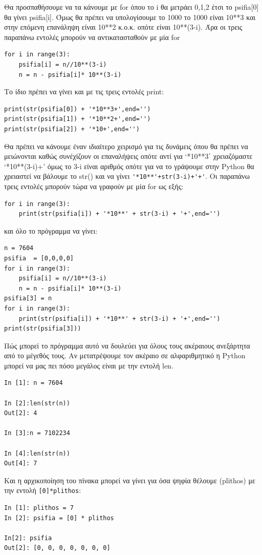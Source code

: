 Θα προσπαθήσουμε να τα κάνουμε με for όπου το i θα μετράει 0,1,2 έτσι το psifia[0] θα γίνει psifia[i]. Όμως θα πρέπει να υπολογίσουμε το 1000 το 1000 είναι 10**3 και στην επόμενη επανάληψη είναι 10**2 κ.ο.κ. οπότε είναι 10**(3-i).
Άρα οι τρεις παραπάνω εντολές μπορούν να αντικατασταθούν με μία for
\begin{lstlisting}
for i in range(3):
    psifia[i] = n//10**(3-i)
    n = n - psifia[i]* 10**(3-i)
\end{lstlisting}

Το ίδιο πρέπει να γίνει και με τις τρεις εντολές print:
\begin{lstlisting}
print(str(psifia[0]) + '*10**3+',end='')
print(str(psifia[1]) + '*10**2+',end='')
print(str(psifia[2]) + '*10+',end='')
\end{lstlisting}
Θα πρέπει να κάνουμε έναν ιδιαίτερο χειρισμό για τις δυνάμεις όπου θα πρέπει να μειώνονται καθώς συνέχίζουν οι επαναλήψεις οπότε αντί για `*10**3΄ χρειαζόμαστε `*10**(3-i)+' όμως το 3-i είναι αριθμός οπότε για να το γράψουμε στην Python θα χρειαστεί να βάλουμε το str() και να γίνει \lstinline{'*10**'+str(3-i)+'+'}. Οι παραπάνω τρεις εντολές μπορούν τώρα να γραφούν με μία for ως εξής:
\begin{lstlisting}
for i in range(3):
    print(str(psifia[i]) + '*10**' + str(3-i) + '+',end='')
\end{lstlisting}
και όλο το πρόγραμμα να γίνει:
\begin{lstlisting}
n = 7604
psifia  = [0,0,0,0]
for i in range(3):
    psifia[i] = n//10**(3-i)
    n = n - psifia[i]* 10**(3-i)
psifia[3] = n
for i in range(3):
    print(str(psifia[i]) + '*10**' + str(3-i) + '+',end='')
print(str(psifia[3]))
\end{lstlisting}

Πώς μπορεί το πρόγραμμα αυτό να δουλεύει για όλους τους ακέραιους ανεξάρτητα από το μέγεθός τους. Αν μετατρέψουμε τον ακέραιο σε αλφαριθμητικό η Python μπορεί να μας πει πόσο μεγάλος είναι με την εντολή len.
\begin{lstlisting}
In [1]: n = 7604

In [2]:len(str(n))
Out[2]: 4

In [3]:n = 7102234

In [4]:len(str(n))
Out[4]: 7
\end{lstlisting}
Και η αρχικοποίηση του πίνακα μπορεί να γίνει για όσα ψηφία θέλουμε (plithos) με την εντολή \lstinline{[0]*plithos}:
\begin{lstlisting}
In [1]: plithos = 7
In [2]: psifia = [0] * plithos

In[2]: psifia
Out[2]: [0, 0, 0, 0, 0, 0, 0]
\end{lstlisting}

